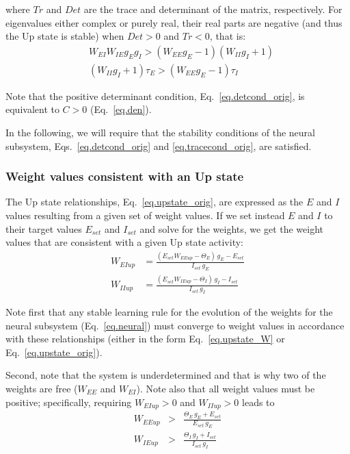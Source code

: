 \documentclass[twocolumn]{article}
\newcommand{\EE}{\mathit{EE}}
\newcommand{\EI}{\mathit{EI}}
\newcommand{\IE}{\mathit{IE}}
\newcommand{\II}{\mathit{II}}
\newcommand{\set}{\mathit{set}}
\newcommand{\up}{\mathit{up}}
\newcommand{\De}{\mathit{Det}}
\newcommand{\Tr}{\mathit{Tr}}
\begin{document}
\noindent where $\Tr$ and $\De$ are the trace and determinant of the matrix, respectively. For eigenvalues either complex or purely real, their real parts are negative (and thus the Up state is stable) when $\De>0$ and $\Tr<0$, that is:
\begin{eqnarray}
& W_{\EI} W_{\IE} g_E g_I > (W_{\EE} g_E - 1)(W_{\II} g_I + 1) \label{eq.detcond_orig}\\
& (W_{\II} g_I + 1)\tau_E > (W_{\EE} g_E - 1)\tau_I
\label{eq.tracecond_orig}
\end{eqnarray}

\noindent Note that the positive determinant condition, Eq.\ \ref{eq.detcond_orig}, is equivalent to $C>0$ (Eq.\ \ref{eq.den}).

In the following, we will require that the stability conditions of the neural subsystem, Eqs.\ \ref{eq.detcond_orig} and \ref{eq.tracecond_orig}, are satisfied.



\subsubsection{Weight values consistent with an Up state}

The Up state relationships, Eq.\ \ref{eq.upstate_orig}, are expressed as the $E$ and $I$ values resulting from a given set of weight values. If we set instead $E$ and $I$ to their target values $E_{\set}$ and $I_{\set}$ and solve for the weights, we get the weight values that are consistent with a given Up state activity:
\begin{equation}
\begin{aligned}
W_{\EI\up} & = \frac{(E_{\set} W_{\EE\up} - \Theta_E) \, g_E - E_{\set}}{I_{\set} \, g_E} \\
W_{\II\up} & = \frac{(E_{\set} W_{\IE\up} - \Theta_I) \, g_I - I_{\set}}{I_{\set} \, g_I}
\end{aligned}
\label{eq.upstate_W}
\end{equation}

\noindent Note first that any stable learning rule for the evolution of the weights for the neural subsystem (Eq.\ \ref{eq.neural}) must converge to weight values in accordance with these relationships (either in the form Eq.\ \ref{eq.upstate_W} or Eq.\ \ref{eq.upstate_orig}).

Second, note that the system is underdetermined and that is why two of the weights are free ($W_{\EE}$ and $W_{\EI}$). Note also that all weight values must be positive; specifically, requiring $W_{\EI\up}>0$ and $W_{\II\up}>0$ leads to
\begin{eqnarray}
W_{\EE\up} & > & \frac{\Theta_E \, g_E + E_{\set}}{E_{\set} \, g_E}
\label{eq.positive_WEI} \\
W_{\IE\up} & > & \frac{\Theta_I \, g_I + I_{\set}}{I_{\set} \, g_I}
\label{eq.positive_WII}
\end{eqnarray}
\end{document}
